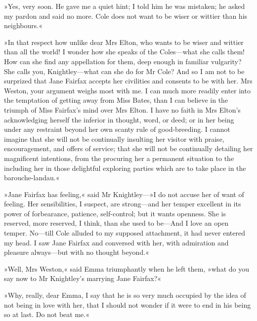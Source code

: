 »Yes, very soon. He gave me a quiet hint; I told him he was mistaken; he asked my pardon and said no more. Cole does not want to be wiser or wittier than his neighbours.«

»In that respect how unlike dear Mrs Elton, who wants to be wiser and wittier than all the world! I wonder how she speaks of the Coles—what she calls them! How can she find any appellation for them, deep enough in familiar vulgarity? She calls you, Knightley—what can she do for Mr Cole? And so I am not to be surprized that Jane Fairfax accepts her civilities and consents to be with her. Mrs Weston, your argument weighs most with me. I can much more readily enter into the temptation of getting away from Miss Bates, than I can believe in the triumph of Miss Fairfax's mind over Mrs Elton. I have no faith in Mrs Elton's acknowledging herself the inferior in thought, word, or deed; or in her being under any restraint beyond her own scanty rule of good-breeding. I cannot imagine that she will not be continually insulting her visitor with praise, encouragement, and offers of service; that she will not be continually detailing her magnificent intentions, from the procuring her a permanent situation to the including her in those delightful exploring parties which are to take place in the barouche-landau.«

»Jane Fairfax has feeling,« said Mr Knightley—»I do not accuse her of want of feeling. Her sensibilities, I suspect, are strong—and her temper excellent in its power of forbearance, patience, self-control; but it wants openness. She is reserved, more reserved, I think, than she used to be—And I love an open temper. No—till Cole alluded to my supposed attachment, it had never entered my head. I saw Jane Fairfax and conversed with her, with admiration and pleasure always—but with no thought beyond.«

»Well, Mrs Weston,« said Emma triumphantly when he left them, »what do you say now to Mr Knightley's marrying Jane Fairfax?«

»Why, really, dear Emma, I say that he is so very much occupied by the idea of not being in love with her, that I should not wonder if it were to end in his being so at last. Do not beat me.«